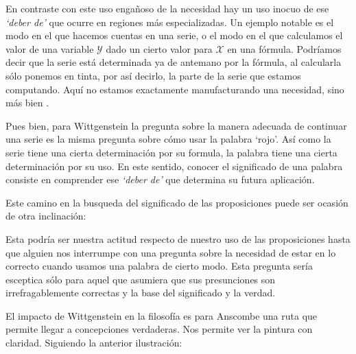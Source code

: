 En contraste con este uso engañoso de la necesidad hay un uso inocuo de ese
\emph{`deber de'} que ocurre en regiones más especializadas. Un ejemplo
notable es el modo en el que hacemos cuentas en una serie, o el modo en el que
calculamos el valor de una variable $\mathcal{Y}$ dado un cierto valor para
$\mathcal{X}$ en una fórmula. Podríamos decir que la serie está determinada ya
de antemano por la fórmula, al calcularla sólo ponemos en tinta, por así
decirlo, la parte de la serie que estamos computando. Aquí no estamos
exactamente manufacturando una necesidad, sino más bien
.

Pues bien, para Wittgenstein la pregunta sobre la manera adecuada de continuar
una serie es la misma pregunta sobre cómo usar la palabra `rojo'. Así como la
serie tiene una cierta determinación por su formula, la palabra tiene una cierta
determinación por su uso. En este sentido, conocer el significado de una palabra
consiste en comprender ese \emph{`deber de'} que determina su futura aplicación.

Este camino en la busqueda del significado de las proposiciones puede ser
ocasión de otra inclinación:

Esta podría ser nuestra actitud respecto de nuestro uso de las proposiciones
hasta que alguien nos interrumpe con una pregunta sobre la necesidad de estar en
lo correcto cuando usamos una palabra de cierto modo. Esta pregunta sería
esceptica sólo para aquel que asumiera que sus presunciones son
irrefragablemente correctas y la base del significado y la
verdad.\autocite[cfr.~][p.~186]{anscombe2011plato:twocuts}

El impacto de Wittgenstein en la filosofía es para Anscombe una ruta que permite
llegar a concepciones verdaderas. Nos permite ver la pintura con claridad.
Siguiendo la anterior ilustración:


